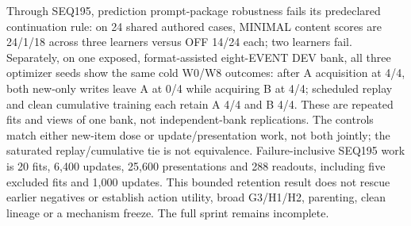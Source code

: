 \documentclass[11pt]{article}
\begin{document}
Through SEQ195, prediction prompt-package robustness fails its predeclared
continuation rule: on 24 shared authored cases, MINIMAL content scores are
24/1/18 across three learners versus OFF 14/24 each; two learners fail.
Separately, on one exposed, format-assisted eight-EVENT DEV bank, all three
optimizer seeds show the same cold W0/W8 outcomes: after A acquisition at 4/4,
both new-only writes leave A at 0/4 while acquiring B at 4/4; scheduled replay
and clean cumulative training each retain A 4/4 and B 4/4. These are repeated
fits and views of one bank, not independent-bank replications. The controls
match either new-item dose or update/presentation work, not both jointly;
the saturated replay/cumulative tie is not equivalence. Failure-inclusive
SEQ195 work is 20 fits, 6,400 updates, 25,600 presentations and 288 readouts,
including five excluded fits and 1,000 updates. This bounded retention result
does not rescue earlier negatives or establish action utility, broad G3/H1/H2,
parenting, clean lineage or a mechanism freeze. The full sprint remains incomplete.
\end{document}
